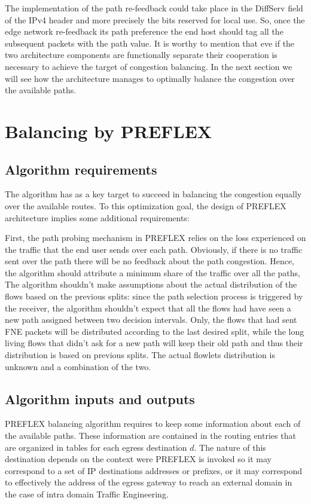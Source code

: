 The implementation of the path re-feedback could take place in the DiffServ field of the IPv4 header and more precisely the bits reserved for local use. So, once the edge network re-feedback its path preference the end host should tag all the subsequent packets with the path value.
It is worthy to mention that eve if the two architecture components are functionally separate their cooperation is necessary to achieve the target of congestion balancing. In the next section we will see how the architecture manages to optimally balance the congestion over the available paths.

\section{Balancing by PREFLEX}

\subsection{Algorithm requirements}
The algorithm has as a key target to succeed in balancing the congestion equally over the available routes. To this optimization goal, the design of PREFLEX architecture implies some additional requirements: 

First, the path probing mechanism in PREFLEX relies on the loss experienced on the traffic that the end user sends over each path. Obviously, if  there is no traffic sent over the path there will be no feedback about the path congestion. Hence, the algorithm should attribute a minimum share of the traffic over all the paths,
The algorithm shouldn't make assumptions about the actual distribution of the flows based on the previous splits: since the path selection process is triggered by the receiver, the algorithm shouldn't expect that all the flows had have seen a new path assigned between two decision intervals. Only, the flows that had sent FNE packets will be distributed according to the last desired split, while the long living flows that didn't ask for a new path will keep their old path and thus their distribution is based on previous splits. The actual flowlets distribution is unknown and a combination of the two.

\subsection{Algorithm inputs and outputs}

PREFLEX balancing algorithm requires to keep some information about each of the available paths. These information are contained in the routing entries that are organized in tables for each egress destination $d$. The nature of this destination depends on the context were PREFLEX is invoked so it may correspond to a set of IP destinations addresses or prefixes, or it may correspond to effectively the  address of the egress gateway to reach an external domain in the case of intra domain Traffic Engineering. 

